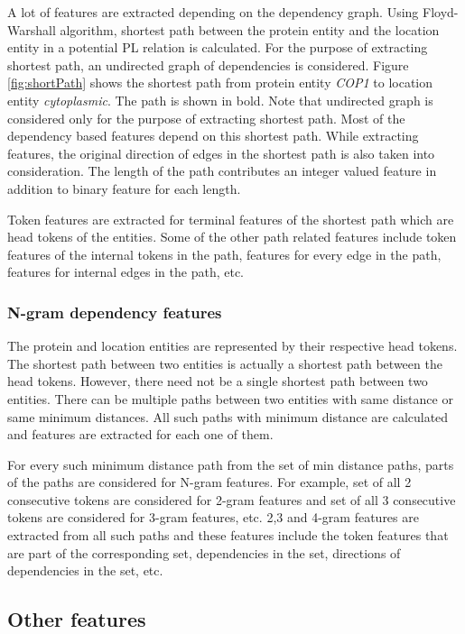 A lot of features are extracted depending on the dependency graph. Using Floyd-Warshall algorithm, shortest path between the protein entity and the location entity in a potential PL relation is calculated. For the purpose of extracting shortest path, an undirected graph of dependencies is considered. Figure \ref{fig:shortPath} shows the shortest path from protein entity \textit{COP1} to location entity \textit{cytoplasmic}. The path is shown in bold. Note that undirected graph is considered only for the purpose of extracting shortest path.  Most of the dependency based features depend on this shortest path. While extracting features, the original direction of edges in the shortest path is also taken into consideration. The length of the path contributes an integer valued feature in addition to binary feature for each length.

Token features are extracted for terminal features of the shortest path which are head tokens of the entities. Some of the other path related features include token features of the internal tokens in the path, features for every edge in the path, features for internal edges in the path, etc.

\subsubsection*{N-gram dependency features}

The protein and location entities are represented by their respective head tokens.  The shortest path between two entities is actually a shortest path between the head tokens. However, there need not be a single shortest path between two entities. There can be multiple paths between two entities with same distance or same minimum distances. All such paths with minimum distance are calculated and features are extracted for each one of them.

For every such minimum distance path from the set of min distance paths, parts of the paths are considered for N-gram features. For example, set of all 2 consecutive tokens are considered for 2-gram features and set of all 3 consecutive tokens are considered for 3-gram features, etc. 2,3 and 4-gram features are extracted from all such paths and these features include the token features that are part of the corresponding set, dependencies in the set, directions of dependencies in the set, etc. 

\subsection*{Other features}

